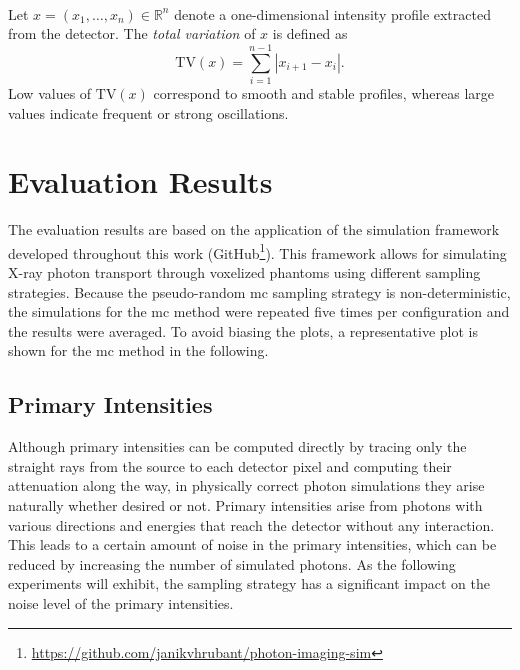 \begin{definition}\ \\
Let $x = (x_1,\dots,x_n) \in \mathbb{R}^n$ denote a one-dimensional 
intensity profile extracted from the detector. The \emph{total variation} 
of $x$ is defined as
\[
    \mathrm{TV}(x) = \sum_{i=1}^{n-1} |x_{i+1} - x_i|.
\]
Low values of $\mathrm{TV}(x)$ correspond to smooth and stable profiles, 
whereas large values indicate frequent or strong oscillations.
\label{def:total_variation}
\end{definition}


\section{Evaluation Results}

The evaluation results are based on the application of the simulation framework
developed throughout this work
(GitHub\footnote{\url{https://github.com/janikvhrubant/photon-imaging-sim}}).
This framework allows for simulating X-ray photon transport through voxelized
phantoms using different sampling strategies. Because the pseudo-random \ac{mc}
sampling strategy is non-deterministic, the simulations for the \ac{mc} method were repeated five times per configuration and the results were averaged. To avoid biasing the plots, a representative plot is shown for the \ac{mc}
method in the following.

\subsection{Primary Intensities}

Although primary intensities can be computed directly by tracing only
the straight rays from the source to each detector pixel and computing their
attenuation along the way, in physically correct photon simulations they arise
naturally whether desired or not. Primary intensities arise from photons with
various directions and energies that reach the detector without any interaction.
This leads to a certain amount of noise in the primary intensities, which can be
reduced by increasing the number of simulated photons. As the following
experiments will exhibit, the sampling strategy has a significant impact on the
noise level of the primary intensities.

